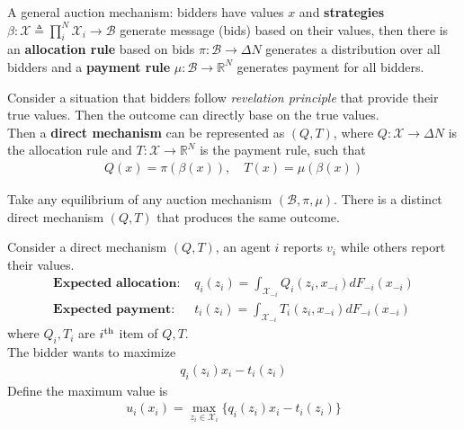 \documentclass[11pt]{elegantbook}
\begin{document}
\begin{definition}
    \normalfont
    A general auction mechanism: bidders have values $x$ and \textbf{strategies} $\beta: \mathcal{X}\triangleq \prod_i^N \mathcal{X}_i \rightarrow \mathcal{B}$ generate message (bids) based on their values, then there is an \textbf{allocation rule} based on bids $\pi: \mathcal{B} \rightarrow \Delta N$ generates a distribution over all bidders and a \textbf{payment rule} $\mu: \mathcal{B} \rightarrow \mathbb{R}^N$ generates payment for all bidders.
\end{definition}

\begin{definition}
    \normalfont
    Consider a situation that bidders follow \textit{revelation principle} that provide their true values. Then the outcome can directly base on the true values.\\
    Then a \textbf{direct mechanism} can be represented as $(Q,T)$, where $Q: \mathcal{X} \rightarrow \Delta N$ is the allocation rule and $T: \mathcal{X} \rightarrow \mathbb{R}^N$ is the payment rule, such that
    \begin{equation}
        \begin{aligned}
            Q(x)=\pi(\beta(x)),\quad T(x)=\mu(\beta(x))
        \end{aligned}
        \nonumber
    \end{equation}
\end{definition}

\begin{proposition}
    Take any equilibrium of any auction mechanism $(\mathcal{B},\pi,\mu)$. There is a distinct direct mechanism $(Q,T)$ that produces the same outcome.
\end{proposition}


Consider a direct mechanism $(Q,T)$, an agent $i$ reports $v_i$ while others report their values.
\begin{equation}
    \begin{aligned}
        \textbf{Expected allocation: }&q_i(z_i)=\int_{\mathcal{X}_{-i}}Q_i(z_i,x_{-i})dF_{-i}(x_{-i})\\
        \textbf{Expected payment: }&t_i(z_i)=\int_{\mathcal{X}_{-i}}T_i(z_i,x_{-i})dF_{-i}(x_{-i})
    \end{aligned}
    \nonumber
\end{equation}
where $Q_i, T_i$ are $i^\textnormal{th}$ item of $Q,T$.\\
The bidder wants to maximize
\begin{equation}
    \begin{aligned}
        q_i(z_i) x_i - t_i(z_i)
    \end{aligned}
    \nonumber
\end{equation}
Define the maximum value is
\begin{equation}
    \begin{aligned}
        u_i(x_i)=\max_{z_i\in \mathcal{X}_i}\{q_i(z_i) x_i - t_i(z_i)\}
    \end{aligned}
    \nonumber
\end{equation}
\end{document}
